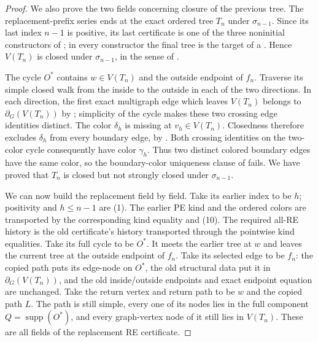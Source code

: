 \begin{proof}
We also prove the two fields concerning closure of the previous tree.
The replacement-prefix series ends at the exact ordered tree \(T_n\)
under \(\sigma_{n-1}\).  Since its last index \(n-1\) is positive, its
last certificate is one of the three noninitial constructors of
; in every constructor the final tree is the
target of a .  Hence \(V(T_n)\) is closed under
\(\sigma_{n-1}\), in the sense of
.

The cycle \(O^*\) contains \(w\in V(T_n)\) and the outside endpoint of
\(f_n\).  Traverse its simple closed walk from the inside to the outside
in each of the two directions.  In each direction, the first exact
multigraph edge which leaves \(V(T_n)\) belongs to
\(\partial_G(V(T_n))\) by ; simplicity of the
cycle makes these two crossing edge identities distinct.  The color
\(\delta_h\) is missing at \(v_h\in V(T_n)\).  Closedness therefore
excludes \(\delta_h\) from every boundary edge, by
.  Both crossing identities on the
two-color cycle consequently have color \(\gamma_h\).  Thus two distinct
colored boundary edges have the same color, so the boundary-color
uniqueness clause of  fails.
We have proved that \(T_n\) is closed but not strongly closed under
\(\sigma_{n-1}\).

We can now build the replacement
 field by field.  Take its
earlier index to be \(h\); positivity and \(h\leq n-1\) are (1).  The
earlier PE kind and the ordered colors are transported by the
corresponding kind equality and (10).  The required all-RE history is the
old certificate's history transported through the pointwise kind
equalities.  Take its full cycle to be \(O^*\).  It meets the earlier
tree at \(w\) and leaves the current tree at the outside endpoint of
\(f_n\).  Take its selected edge to be \(f_n\): the copied path puts its
edge-node on \(O^*\), the old structural data put it in
\(\partial_G(V(T_n))\), and the old inside/outside endpoints and exact
endpoint equation are unchanged.  Take the return vertex and return path
to be \(w\) and the copied path \(L\).  The path is still simple, every
one of its nodes lies in the full component \(Q=\operatorname{supp}(O^*)\),
and every graph-vertex node of it still lies in \(V(T_n)\).  These are
all fields of the replacement RE certificate.


\end{proof}
